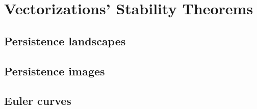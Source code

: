 
\chapter{Vectorizations' Stability Theorems}
\section{Persistence landscapes}
\section{Persistence images}
\section{Euler curves}